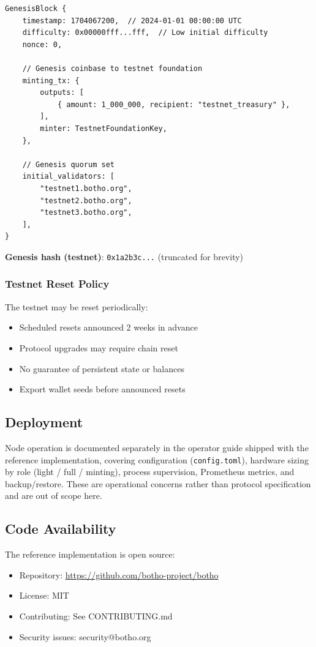 \begin{lstlisting}[caption={Testnet genesis specification}]
GenesisBlock {
    timestamp: 1704067200,  // 2024-01-01 00:00:00 UTC
    difficulty: 0x00000fff...fff,  // Low initial difficulty
    nonce: 0,

    // Genesis coinbase to testnet foundation
    minting_tx: {
        outputs: [
            { amount: 1_000_000, recipient: "testnet_treasury" },
        ],
        minter: TestnetFoundationKey,
    },

    // Genesis quorum set
    initial_validators: [
        "testnet1.botho.org",
        "testnet2.botho.org",
        "testnet3.botho.org",
    ],
}
\end{lstlisting}

\textbf{Genesis hash (testnet)}: \texttt{0x1a2b3c...} (truncated for brevity)

\subsubsection{Testnet Reset Policy}

The testnet may be reset periodically:
\begin{itemize}
  \item Scheduled resets announced 2 weeks in advance
  \item Protocol upgrades may require chain reset
  \item No guarantee of persistent state or balances
  \item Export wallet seeds before announced resets
\end{itemize}

\subsection{Deployment}

Node operation is documented separately in the operator guide shipped with
the reference implementation, covering configuration
(\texttt{config.toml}), hardware sizing by role (light / full / minting),
process supervision, Prometheus metrics, and backup/restore. These are
operational concerns rather than protocol specification and are out of scope
here.

\subsection{Code Availability}

The reference implementation is open source:

\begin{itemize}
  \item Repository: \url{https://github.com/botho-project/botho}
  \item License: MIT
  \item Contributing: See CONTRIBUTING.md
  \item Security issues: security@botho.org
\end{itemize}

